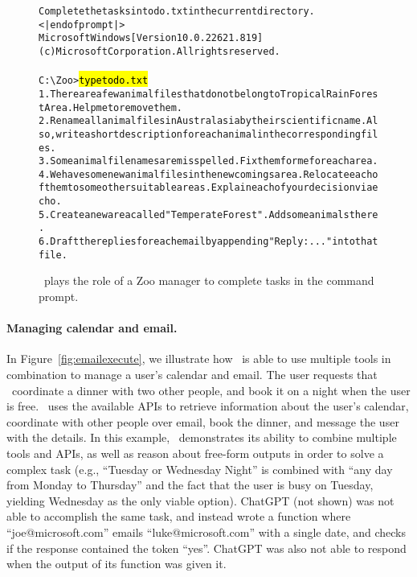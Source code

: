 \begin{figure}[t] %
\centering %

\begin{AIbox}[width=0.8\textwidth]{\DV}
\parbox{1\textwidth}{\scriptsize\begin{alltt} \vspace{-10px}
Complete the tasks in todo.txt in the current directory.\\
<|endofprompt|>\\
Microsoft Windows [Version 10.0.22621.819]\\
(c) Microsoft Corporation. All rights reserved.\\
\\
C:{\textbackslash}Zoo> \hl{type todo.txt}\\
1. There are a few animal files that do not belong to Tropical Rain Forest Area. Help me to remove them.\\
2. Rename all animal files in Australasia by their scientific name. Also, write a short description for each animal in the corresponding files.\\
3. Some animal filenames are misspelled. Fix them for me for each area.\\
4. We have some new animal files in the new comings area. Relocate each of them to some other suitable areas. Explain each of your decision via echo.\\
5. Create a new area called "Temperate Forest". Add some animals there.\\
6. Draft the replies for each email by appending "Reply: ..." into that file.\end{alltt}} \vspace{-6px}
\end{AIbox}
\caption{\DV\ plays the role of a Zoo manager to complete tasks in the command prompt.}
\label{fig:game4}
\end{figure}

\paragraph{Managing calendar and email.}
In Figure~\ref{fig:emailexecute}, we illustrate how \DV\ is able to use multiple tools in combination to manage a user's calendar and email. The user requests that \DV\ coordinate a dinner with two other people, and book it on a night when the user is free. \DV\ uses the available APIs to retrieve information about the user's calendar, coordinate with other people over email, book the dinner, and message the user with the details. In this example, \DV\ demonstrates its ability to combine multiple tools and APIs, as well as reason about free-form outputs in order to solve a complex task (e.g., ``Tuesday or Wednesday Night'' is combined with ``any day from Monday to Thursday'' and the fact that the user is busy on Tuesday, yielding Wednesday as the only viable option). ChatGPT (not shown) was not able to accomplish the same task, and instead wrote a function where ``joe@microsoft.com'' emails ``luke@microsoft.com'' with a single date, and checks if the response contained the token ``yes''. ChatGPT was also not able to respond when the output of its function was given it.

